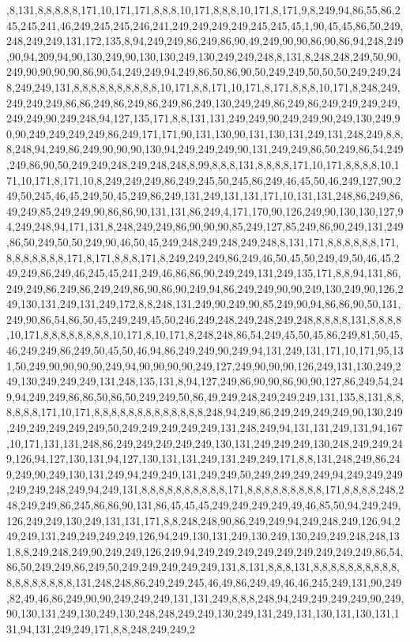 ,8,131,8,8,8,8,8,171,10,171,171,8,8,8,10,171,8,8,8,10,171,8,171,9,8,249,94,86,55,86,245,245,241,46,249,245,245,246,241,249,249,249,249,245,245,45,1,90,45,45,86,50,249,248,249,249,131,172,135,8,94,249,249,86,249,86,90,49,249,90,90,86,90,86,94,248,249,90,94,209,94,90,130,249,90,130,130,249,130,249,249,248,8,131,8,248,248,249,50,90,249,90,90,90,90,86,90,54,249,249,94,249,86,50,86,90,50,249,249,50,50,50,249,249,248,249,249,131,8,8,8,8,8,8,8,8,8,8,10,171,8,8,171,10,171,8,171,8,8,8,10,171,8,248,249,249,249,249,86,86,249,86,249,86,249,86,249,130,249,249,86,249,86,249,249,249,249,249,249,90,249,248,94,127,135,171,8,8,131,131,249,249,90,249,249,90,249,130,249,90,90,249,249,249,249,86,249,171,171,90,131,130,90,131,130,131,249,131,248,249,8,8,8,248,94,249,86,249,90,90,90,130,94,249,249,249,90,131,249,249,86,50,249,86,54,249,249,86,90,50,249,249,248,249,248,248,8,99,8,8,8,131,8,8,8,8,171,10,171,8,8,8,8,10,171,10,171,8,171,10,8,249,249,249,86,249,245,50,245,86,249,46,45,50,46,249,127,90,249,50,245,46,45,249,50,45,249,86,249,131,249,131,131,171,10,131,131,248,86,249,86,49,249,85,249,249,90,86,86,90,131,131,86,249,4,171,170,90,126,249,90,130,130,127,94,249,248,94,171,131,8,248,249,249,86,90,90,90,85,249,127,85,249,86,90,249,131,249,86,50,249,50,50,249,90,46,50,45,249,248,249,248,249,248,8,131,171,8,8,8,8,8,8,171,8,8,8,8,8,8,8,171,8,171,8,8,8,171,8,249,249,249,86,249,46,50,45,50,249,49,50,46,45,249,249,86,249,46,245,45,241,249,46,86,86,90,249,249,131,249,135,171,8,8,94,131,86,249,249,86,249,86,249,249,86,90,86,90,249,94,86,249,249,90,90,249,130,249,90,126,249,130,131,249,131,249,172,8,8,248,131,249,90,249,90,85,249,90,94,86,86,90,50,131,249,90,86,54,86,50,45,249,249,45,50,246,249,248,249,248,249,248,8,8,8,8,131,8,8,8,8,10,171,8,8,8,8,8,8,8,8,10,171,8,10,171,8,248,248,86,54,249,45,50,45,86,249,81,50,45,46,249,249,86,249,50,45,50,46,94,86,249,249,90,249,94,131,249,131,171,10,171,95,131,50,249,90,90,90,90,249,94,90,90,90,90,249,127,249,90,90,90,126,249,131,130,249,249,130,249,249,249,131,248,135,131,8,94,127,249,86,90,90,86,90,90,127,86,249,54,249,94,249,249,86,86,50,86,50,249,249,50,86,49,249,248,249,249,249,131,135,8,131,8,8,8,8,8,8,171,10,171,8,8,8,8,8,8,8,8,8,8,8,8,8,248,94,249,86,249,249,249,249,90,130,249,249,249,249,249,249,50,249,249,249,249,249,131,248,249,94,131,131,249,131,94,167,10,171,131,131,248,86,249,249,249,249,249,130,131,249,249,249,130,248,249,249,249,126,94,127,130,131,94,127,130,131,131,249,131,249,249,171,8,8,131,248,249,86,249,249,90,249,130,131,249,94,249,249,131,249,249,50,249,249,249,249,94,249,249,249,249,249,248,249,94,249,131,8,8,8,8,8,8,8,8,8,8,171,8,8,8,8,8,8,8,8,8,171,8,8,8,8,248,248,249,249,86,245,86,86,90,131,86,45,45,45,249,249,249,249,49,46,85,50,94,249,249,126,249,249,130,249,131,131,171,8,8,248,248,90,86,249,249,94,249,248,249,126,94,249,249,131,249,249,249,249,126,94,249,130,131,249,130,249,130,249,249,248,248,131,8,8,249,248,249,90,249,249,126,249,94,249,249,249,249,249,249,249,249,249,86,54,86,50,249,249,86,249,50,249,249,249,249,249,131,8,131,8,8,8,131,8,8,8,8,8,8,8,8,8,8,8,8,8,8,8,8,8,8,131,248,248,86,249,249,245,46,49,86,249,49,46,46,245,249,131,90,249,82,49,46,86,249,90,90,249,249,249,131,131,249,8,8,8,248,94,249,249,249,249,90,249,90,130,131,249,130,249,130,248,248,249,249,130,249,131,249,131,130,131,130,131,131,94,131,249,249,171,8,8,248,249,249,2